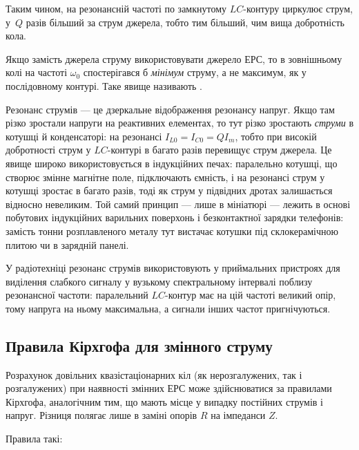Таким чином, на резонансній частоті по замкнутому $LC$-контуру циркулює струм, у~$Q$ разів більший за струм джерела, тобто тим більший, чим вища добротність кола.

Якщо замість джерела струму використовувати джерело ЕРС, то в зовнішньому колі на частоті $\omega_0$ спостерігався б \emph{мінімум} струму, а не максимум, як у послідовному контурі. Таке явище називають .

\begin{Attention}
	Резонанс струмів --- це дзеркальне відображення резонансу напруг. Якщо там різко зростали напруги на реактивних елементах, то тут різко зростають \emph{струми} в котушці й конденсаторі: на резонансі $I_{L0} = I_{C0} = QI_m$, тобто при високій добротності струм у $LC$-контурі в багато разів перевищує струм джерела. Це явище широко використовується в індукційних печах: паралельно котушці, що створює змінне магнітне поле, підключають ємність, і на резонансі струм у котушці зростає в багато разів, тоді як струм у підвідних дротах залишається відносно невеликим. Той самий принцип --- лише в мініатюрі --- лежить в основі побутових індукційних варильних поверхонь і безконтактної зарядки телефонів: замість тонни розплавленого металу тут вистачає котушки під склокерамічною плитою чи в зарядній панелі.

	У радіотехніці резонанс струмів використовують у приймальних пристроях для виділення слабкого сигналу у вузькому спектральному інтервалі поблизу резонансної частоти: паралельний $LC$-контур має на цій частоті великий опір, тому напруга на ньому максимальна, а сигнали інших частот пригнічуються.
\end{Attention}


\subsection*{Правила Кірхгофа для змінного струму}

Розрахунок довільних квазістаціонарних кіл (як нерозгалужених, так і розгалужених) при наявності змінних ЕРС може здійснюватися за правилами Кірхгофа, аналогічним тим, що мають місце у
випадку постійних струмів і напруг. Різниця полягає лише в заміні
опорів $R$ на імпеданси $Z$.

Правила такі:

